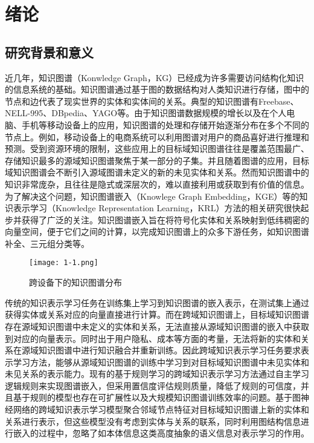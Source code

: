 \chapter{绪论}

\section{研究背景和意义}
近几年，知识图谱（Konwledge Graph，KG）已经成为许多需要访问结构化知识的信息系统的基础\cite{zou2020survey}。知识图谱通过基于图的数据结构对人类知识进行存储，图中的节点和边代表了现实世界的实体和实体间的关系。典型的知识图谱有Freebase\cite{bollacker2008freebase}、NELL-995\cite{xiong2017deeppath}、DBpedia\cite{bizer2009dbpedia}、YAGO\cite{suchanek2007yago}等。由于知识图谱数据规模的增长以及在个人电脑、手机等移动设备上的应用，知识图谱的处理和存储开始逐渐分布在多个不同的节点上。例如，移动设备上的电商系统可以利用图谱对用户的商品喜好进行推理和预测。受到资源环境的限制，这些应用上的目标域知识图谱往往是覆盖范围最广、存储知识最多的源域知识图谱聚焦于某一部分的子集。并且随着图谱的应用，目标域知识图谱会不断引入源域图谱未定义的新的未见实体和关系。然而知识图谱中的知识非常庞杂，且往往是隐式或深层次的，难以直接利用或获取到有价值的信息。为了解决这个问题，知识图谱嵌入（Knowlege Graph Embedding，KGE）等的知识表示学习（Knowledge Representation Learning，KRL）方法的相关研究很快起步并获得了广泛的关注。知识图谱嵌入旨在将符号化实体和关系映射到低纬稠密的向量空间，便于它们之间的计算\cite{2021-eh}，以完成知识图谱上的众多下游任务，如知识图谱补全、三元组分类等。
\begin{figure}[h]
  \centering
  \texttt{[image: 1-1.png]}
  \caption{跨设备下的知识图谱分布}
  \label{fig:1-1}
\end{figure}

传统的知识表示学习任务在训练集上学习到知识图谱的嵌入表示，在测试集上通过获得实体或关系对应的向量直接进行计算。而在跨域知识图谱上，目标域知识图谱存在源域知识图谱中未定义的实体和关系，无法直接从源域知识图谱的嵌入中获取到对应的向量表示。同时出于用户隐私、成本等方面的考量，无法将新的实体和关系在源域知识图谱中进行知识融合并重新训练。因此跨域知识表示学习任务要求表示学习方法，能够从源域知识图谱的训练中学习到对目标域知识图谱中未见实体和未见关系的表示能力。现有的基于规则学习的跨域知识表示学习方法通过自主学习逻辑规则来实现图谱嵌入，但采用置信度评估规则质量，降低了规则的可信度，并且基于规则的模型也存在可扩展性以及大规模知识图谱训练效率的问题。基于图神经网络的跨域知识表示学习模型聚合邻域节点特征对目标域知识图谱上新的实体和关系进行表示，但这些模型没有考虑到实体与关系的联系，同时利用图结构信息进行嵌入的过程中，忽略了如本体信息这类高度抽象的语义信息对表示学习的作用。

